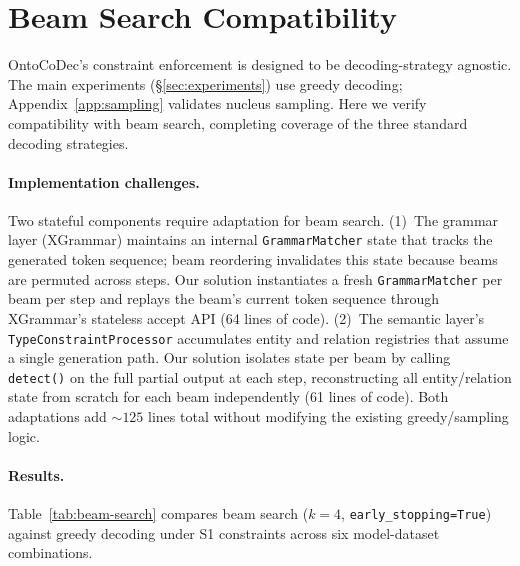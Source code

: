 \section{Beam Search Compatibility}
\label{app:beam-search}

OntoCoDec's constraint enforcement is designed to be decoding-strategy agnostic.
The main experiments (\S\ref{sec:experiments}) use greedy decoding; Appendix~\ref{app:sampling} validates nucleus sampling.
Here we verify compatibility with beam search, completing coverage of the three standard decoding strategies.

\paragraph{Implementation challenges.}
Two stateful components require adaptation for beam search.
(1)~The grammar layer (XGrammar) maintains an internal \texttt{GrammarMatcher} state that tracks the generated token sequence; beam reordering invalidates this state because beams are permuted across steps.
Our solution instantiates a fresh \texttt{GrammarMatcher} per beam per step and replays the beam's current token sequence through XGrammar's stateless accept API (64 lines of code).
(2)~The semantic layer's \texttt{TypeConstraintProcessor} accumulates entity and relation registries that assume a single generation path.
Our solution isolates state per beam by calling \texttt{detect()} on the full partial output at each step, reconstructing all entity/relation state from scratch for each beam independently (61 lines of code).
Both adaptations add ${\sim}125$ lines total without modifying the existing greedy/sampling logic.

\paragraph{Results.}
Table~\ref{tab:beam-search} compares beam search ($k{=}4$, \texttt{early\_stopping=True}) against greedy decoding under S1 constraints across six model-dataset combinations.

